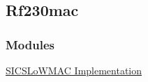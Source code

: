 \hypertarget{a00064}{\subsection{\-Rf230mac}
\label{a00064}
}
\subsubsection*{\-Modules}
\begin{DoxyCompactItemize}
\item 
\hyperlink{a00055}{\-S\-I\-C\-S\-Lo\-W\-M\-A\-C Implementation}
\end{DoxyCompactItemize}
